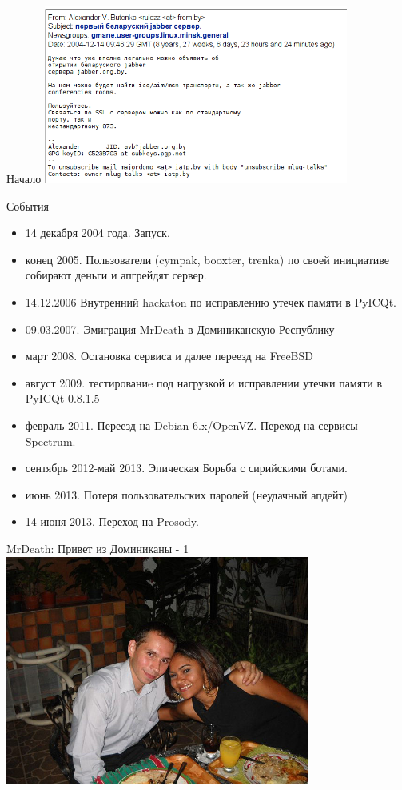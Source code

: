 \begin{frame}{Начало}
\includegraphics[width=10cm]{beginning}
\end{frame}

\begin{frame}{События}

  \begin{itemize}
    \item 14 декабря 2004 года. Запуск.
    \item конец 2005. Пользователи (cympak, booxter, trenka) по своей инициативе собирают деньги и апгрейдят сервер.
    \item 14.12.2006 Внутренний hackaton по исправлению утечек памяти в PyICQt.  
    \item 09.03.2007. Эмиграция MrDeath в Доминиканскую Республику
    \item март 2008. Остановка сервиса и далее переезд на FreeBSD
    \item август 2009. тестированиe под нагрузкой и исправлении утечки памяти в PyICQt 0.8.1.5
    \item февраль 2011. Переезд на Debian 6.x/OpenVZ. Переход на сервисы Spectrum.
    \item сентябрь 2012-май 2013. Эпическая Борьба с сирийскими ботами.
    \item июнь 2013. Потеря пользовательских паролей (неудачный апдейт)
    \item 14 июня 2013. Переход на Prosody.
  \end{itemize}

\end{frame}

\begin{frame}{MrDeath: Привет из Доминиканы - 1}
  \includegraphics[width=10cm]{avb_with_Karla}
\end{frame}


